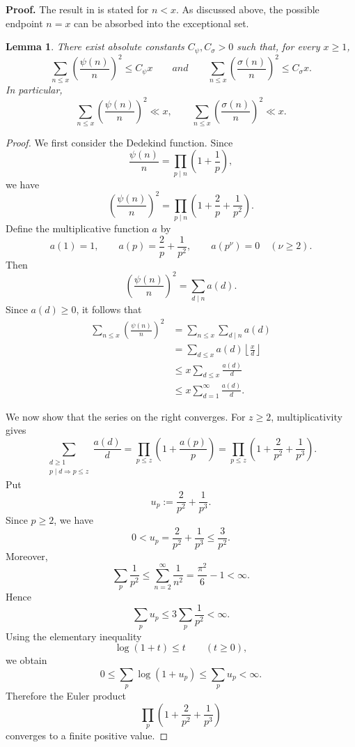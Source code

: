 \documentclass{article}
\newtheorem{lemma}[theorem]{Lemma}
\theoremstyle{remark}
\begin{document}
\textbf{Proof.} The result in \cite[Theorem 4]{ref2} is stated for \(n<x\). As discussed above, the possible endpoint \(n=x\) can be absorbed into the exceptional set.


\begin{lemma}\label{lem:second-moments}
There exist absolute constants $C_{\psi},C_{\sigma}>0$ such that, for every
$x\geq 1$,
\[
\sum_{n\leq x}\left(\frac{\psi(n)}{n}\right)^2
\leq C_{\psi}x \qquad
and
\qquad
\sum_{n\leq x}\left(\frac{\sigma(n)}{n}\right)^2
\leq C_{\sigma}x.
\]
In particular,
\[
\sum_{n\leq x}\left(\frac{\psi(n)}{n}\right)^2\ll x,
\qquad
\sum_{n\leq x}\left(\frac{\sigma(n)}{n}\right)^2\ll x.
\]
\end{lemma}

\begin{proof}
We first consider the Dedekind function. Since
\[
\frac{\psi(n)}{n}
=
\prod_{p\mid n}\left(1+\frac1p\right),
\]
we have
\[
\left(\frac{\psi(n)}{n}\right)^2
=
\prod_{p\mid n}
\left(1+\frac2p+\frac1{p^2}\right).
\]
Define the multiplicative function \(a\) by
\[
a(1)=1,\qquad
a(p)=\frac2p+\frac1{p^2},
\qquad
a(p^\nu)=0\quad(\nu\geq2).
\]
Then
\[
\left(\frac{\psi(n)}{n}\right)^2
=
\sum_{d\mid n}a(d).
\]
Since \(a(d)\geq0\), it follows that
\[
\begin{aligned}
\sum_{n\leq x}\left(\frac{\psi(n)}{n}\right)^2
&=
\sum_{n\leq x}\sum_{d\mid n}a(d)\\
&=
\sum_{d\leq x}a(d)
\left\lfloor\frac{x}{d}\right\rfloor\\
&\leq
x\sum_{d\leq x}\frac{a(d)}{d}\\
&\leq
x\sum_{d=1}^{\infty}\frac{a(d)}{d}.
\end{aligned}
\]

We now show that the series on the right converges. For \(z\geq2\),
multiplicativity gives
\[
\sum_{\substack{d\geq1\\ p\mid d\Rightarrow p\leq z}}
\frac{a(d)}{d}
=
\prod_{p\leq z}
\left(1+\frac{a(p)}{p}\right)
=
\prod_{p\leq z}
\left(1+\frac2{p^2}+\frac1{p^3}\right).
\]
Put
\[
u_p:=\frac2{p^2}+\frac1{p^3}.
\]
Since \(p\geq2\), we have
\[
0<u_p
=
\frac2{p^2}+\frac1{p^3}
\leq
\frac3{p^2}.
\]
Moreover,
\[
\sum_p\frac1{p^2}
\leq
\sum_{n=2}^{\infty}\frac1{n^2}
=
\frac{\pi^2}{6}-1
<
\infty.
\]
Hence
\[
\sum_pu_p
\leq
3\sum_p\frac1{p^2}
<
\infty.
\]
Using the elementary inequality
\[
\log(1+t)\leq t
\qquad(t\geq0),
\]
we obtain
\[
0\leq
\sum_p\log(1+u_p)
\leq
\sum_pu_p
<
\infty.
\]
Therefore the Euler product
\[
\prod_p
\left(1+\frac2{p^2}+\frac1{p^3}\right)
\]
converges to a finite positive value.


\end{proof}
\end{document}
